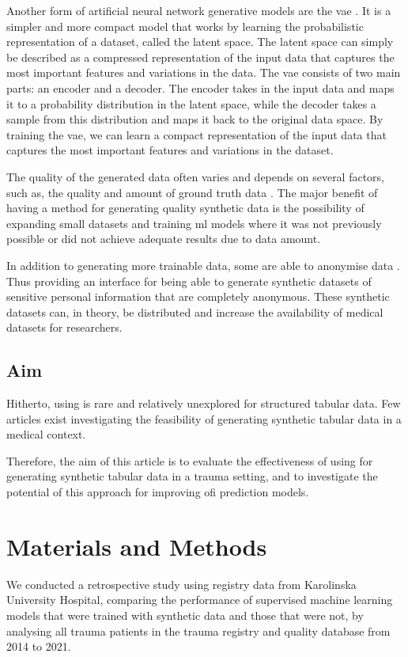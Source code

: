 \documentclass[12pt, letterpaper]{article}
\begin{document}
Another form of artificial neural network generative models are the \acrfull{vae} \cite{kingma_auto-encoding_2013}. It is a simpler and more compact model that works by learning the probabilistic representation of a dataset, called the latent space. The latent space can simply be described as a compressed representation of the input data that captures the most important features and variations in the data. The \acrshort{vae} consists of two main parts: an encoder and a decoder. The encoder takes in the input data and maps it to a probability distribution in the latent space, while the decoder takes a sample from this distribution and maps it back to the original data space. By training the \acrshort{vae}, we can learn a compact representation of the input data that captures the most important features and variations in the dataset.


The quality of the generated data often varies and depends on several factors, such as, the quality and amount of ground truth data \cite{karras_training_2020}. The major benefit of having a method for generating quality synthetic data is the possibility of expanding small datasets and training \acrshort{ml} models where it was not previously possible or did not achieve adequate results due to data amount.

In addition to generating more trainable data, some  are able to anonymise data \cite{liu_ppgan_2019}. Thus providing an interface for being able to generate synthetic datasets of sensitive personal information that are completely anonymous. These synthetic datasets can, in theory, be distributed and increase the availability of medical datasets for researchers.

\subsection{Aim}
Hitherto, using  is rare and relatively unexplored for structured tabular data. Few articles exist investigating the feasibility of generating synthetic tabular data in a medical context.

Therefore, the aim of this article is to evaluate the effectiveness of using  for generating synthetic tabular data in a trauma setting, and to investigate the potential of this approach for improving \acrshort{ofi} prediction models.

\section{Materials and Methods}
We conducted a retrospective study using registry data from Karolinska University Hospital, comparing the performance of supervised machine learning models that were trained with synthetic data and those that were not, by analysing all trauma patients in the trauma registry and quality database from 2014 to 2021.
\end{document}
